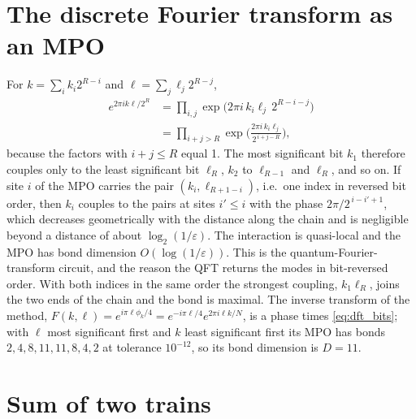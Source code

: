 \documentclass[aps,prb,reprint,a4paper]{revtex4-2}
\begin{document}
\section{The discrete Fourier transform as an MPO}
\label{app:qft}

For $k=\sum_ik_i2^{R-i}$ and $\ell=\sum_j\ell_j2^{R-j}$,
\begin{equation}
  \begin{aligned}
  e^{2\pi ik\ell/2^R}&=\prod_{i,j}\exp\big(2\pi i\,k_i\ell_j\,2^{R-i-j}\big)\\
  &=\prod_{i+j>R}\exp\Big(\frac{2\pi i\,k_i\ell_j}{2^{\,i+j-R}}\Big),
  \end{aligned}
  \label{eq:dft_bits}
\end{equation}
because the factors with $i+j\le R$ equal 1. The most significant bit $k_1$ therefore couples only to the least significant bit $\ell_R$, $k_2$ to $\ell_{R-1}$ and $\ell_R$, and so on. If site $i$ of the MPO carries the pair $(k_i,\ell_{R+1-i})$, i.e.\ one index in reversed bit order, then $k_i$ couples to the pairs at sites $i'\le i$ with the phase $2\pi/2^{\,i-i'+1}$, which decreases geometrically with the distance along the chain and is negligible beyond a distance of about $\log_2(1/\varepsilon)$. The interaction is quasi-local and the MPO has bond dimension $O(\log(1/\varepsilon))$. This is the quantum-Fourier-transform circuit, and the reason the QFT returns the modes in bit-reversed order. With both indices in the same order the strongest coupling, $k_1\ell_R$, joins the two ends of the chain and the bond is maximal. The inverse transform of the method, $F(k,\ell)=e^{i\pi\ell\phi_k/4}=e^{-i\pi\ell/4}e^{2\pi i\ell k/N}$, is a phase times \eqref{eq:dft_bits}; with $\ell$ most significant first and $k$ least significant first its MPO has bonds $2,4,8,11,11,8,4,2$ at tolerance $10^{-12}$, so its bond dimension is $D=11$.

\section{Sum of two trains}
\label{app:sum}
\end{document}
